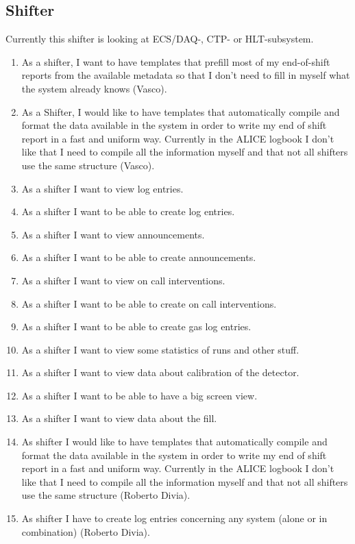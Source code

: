 \documentclass[a4paper,11pt]{book}
\begin{document}
\subsection{Shifter}
Currently this shifter is looking at ECS/DAQ-, CTP- or HLT-subsystem. 
\begin{enumerate}
  \item As a shifter, I want to have templates that prefill most of my end-of-shift reports from the available metadata so that I don’t need to fill in myself what the system already knows (Vasco).
  \item As a Shifter, I would like to have templates that automatically compile and format the data available in the system in order to write my end of shift report in a fast and uniform way. Currently in the ALICE logbook I don't like that I need to compile all the information myself and that not all shifters use the same structure (Vasco).
  \item As a shifter I want to view log entries.
  \item As a shifter I want to be able to create log entries.
  \item As a shifter I want to view announcements.
  \item As a shifter I want to be able to create announcements.
  \item As a shifter I want to view on call interventions.
  \item As a shifter I want to be able to create on call interventions.
  \item As a shifter I want to be able to create gas log entries.
  \item As a shifter I want to view some statistics of runs and other stuff.
  \item As a shifter I want to view data about calibration of the detector.
  \item As a shifter I want to be able to have a big screen view.
  \item As a shifter I want to view data about the fill.
  \item As shifter I would like to have templates that automatically compile  and format the data available in the system in order to write my end of shift report in a fast and uniform way. Currently in the ALICE logbook I don't like that I need to compile all the information myself and that not all shifters use the same structure (Roberto Divia).
  \item As shifter I have to create log entries concerning any system (alone or in combination) (Roberto Divia).

\end{enumerate}
\end{document}
